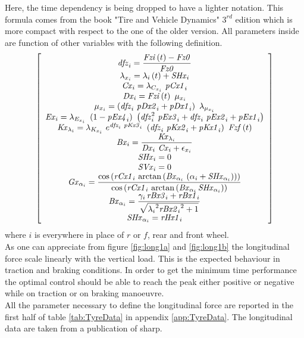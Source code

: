 %
Here, the time dependency is being dropped to have a lighter notation. This formula comes from the book "Tire and Vehicle Dynamics" $3^{rd}$ edition\cite{pacejka2012tire} which is more compact with respect to the one of the older version\cite{pacejka2006tyre}.
All parameters inside are function of other variables with the following definition.
%
\begin{equation}
\label{eq:ParamLong}
\left[ \begin{array}{c} 
\displaystyle {\it dfz}_{i} =\frac{{\it Fzi} \left(t 
\right)-{\it Fz0} }{{\it Fz0} }\\ \lambda_{x_{i}} =
\lambda_{i} \left(t \right)+{\it SHx}_{i} \\ {\it Cx
}_{i} =\lambda_{C_{x_{i}}} ~{\it pCx1}_{i} \\ {\it 
Dx}_{i} ={\it Fzi} \left(t \right)~\mu_{x_{i}} \\ 
\mu_{x_{i}} =\left({\it dfz}_{i} ~{\it pDx2}_{i} +{\it pDx1}_{i} 
\right)~\lambda_{\mu_{x_{i}}} \\ {\it Ex}_{i} =
\lambda_{E_{x_{i}}} ~\left(1-{\it pEx4}_{i} \right)~\left({\it dfz}_{i
} ^{2}~{\it pEx3}_{i} +{\it dfz}_{i} ~{\it pEx2}_{i} +{\it pEx1}_{i} 
\right)\\ {\it Kx}_{\lambda_{i}} =\lambda_{K_{x_{i}}
} ~e^{{\it dfz}_{i} ~{\it pKx3}_{i} }~\left({\it dfz}_{i} ~{\it pKx2}_
{i} +{\it pKx1}_{i} \right)~{\it Fzf} \left(t \right)
\\ \displaystyle {\it Bx}_{i} =\frac{{\it Kx}_{\lambda_{i}} }{{
\it Dx}_{i} ~{\it Cx}_{i} +\epsilon_{x_{i}} }\\ {
\it SHx}_{i} =0\\ {\it SVx}_{i} =0\\
\displaystyle {\it Gx}_{\alpha_{i}}={\frac {\cos \left( {\it rCx1}_{i}\,\arctan\left( {\it Bx}_{\alpha_{i}}\, \left( \alpha_{i}+{\it SHx}_{\alpha_{i}} \right)  \right)  \right) }{\cos \left( {\it rCx1}_{i}\,\arctan\left( {\it Bx}_{\alpha_{i}}\,{\it SHx}_{\alpha_{i}} \right) \right) }}\\
\displaystyle {\it Bx}_{\alpha_{i}}={\frac {\gamma_{i}\,{\it rBx3}_{i}+{\it rBx1}_{i}}{\sqrt {{\lambda_{i}}^{2}{{\it rBx2}_{i}}^{2}+1}}}\\
{\it SHx}_{\alpha_{i}}={\it rHx1}_{i}
\end{array}\right] 
\end{equation}
%
where $i$ is everywhere in place of $r$ or $f$, rear and front wheel.\\
As one can appreciate from figure \ref{fig:long1a} and \ref{fig:long1b} the longitudinal force scale linearly with the vertical load. This is the expected behaviour in traction and braking conditions. In order to get the minimum time performance the optimal control should be able to reach the peak either positive or negative while on traction or on braking manoeuvre.\\
All the parameter necessary to define the longitudinal force are reported in the first half of table \ref{tab:TyreData} in appendix \ref{app:TyreData}. The longitudinal data are taken from a publication of sharp.\cite{sharp2014method}
%
